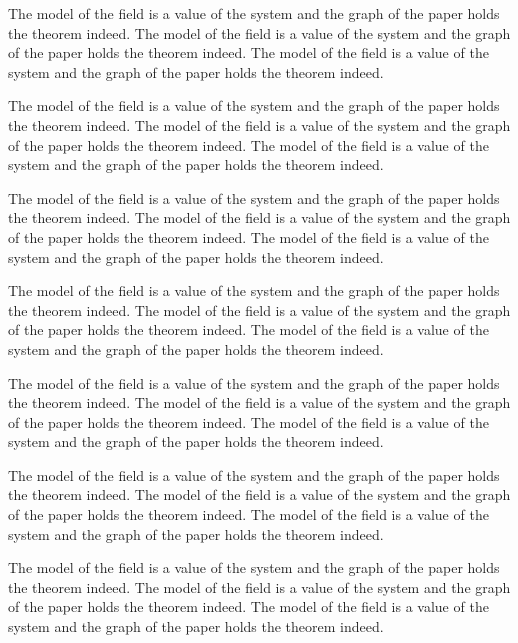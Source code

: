 \documentclass{article}
\begin{document}
The model of the field is a value of the system and the graph of the paper holds the theorem indeed. The model of the field is a value of the system and the graph of the paper holds the theorem indeed. The model of the field is a value of the system and the graph of the paper holds the theorem indeed.

The model of the field is a value of the system and the graph of the paper holds the theorem indeed. The model of the field is a value of the system and the graph of the paper holds the theorem indeed. The model of the field is a value of the system and the graph of the paper holds the theorem indeed.

The model of the field is a value of the system and the graph of the paper holds the theorem indeed. The model of the field is a value of the system and the graph of the paper holds the theorem indeed. The model of the field is a value of the system and the graph of the paper holds the theorem indeed.

The model of the field is a value of the system and the graph of the paper holds the theorem indeed. The model of the field is a value of the system and the graph of the paper holds the theorem indeed. The model of the field is a value of the system and the graph of the paper holds the theorem indeed.

The model of the field is a value of the system and the graph of the paper holds the theorem indeed. The model of the field is a value of the system and the graph of the paper holds the theorem indeed. The model of the field is a value of the system and the graph of the paper holds the theorem indeed.

The model of the field is a value of the system and the graph of the paper holds the theorem indeed. The model of the field is a value of the system and the graph of the paper holds the theorem indeed. The model of the field is a value of the system and the graph of the paper holds the theorem indeed.

The model of the field is a value of the system and the graph of the paper holds the theorem indeed. The model of the field is a value of the system and the graph of the paper holds the theorem indeed. The model of the field is a value of the system and the graph of the paper holds the theorem indeed.
\end{document}
